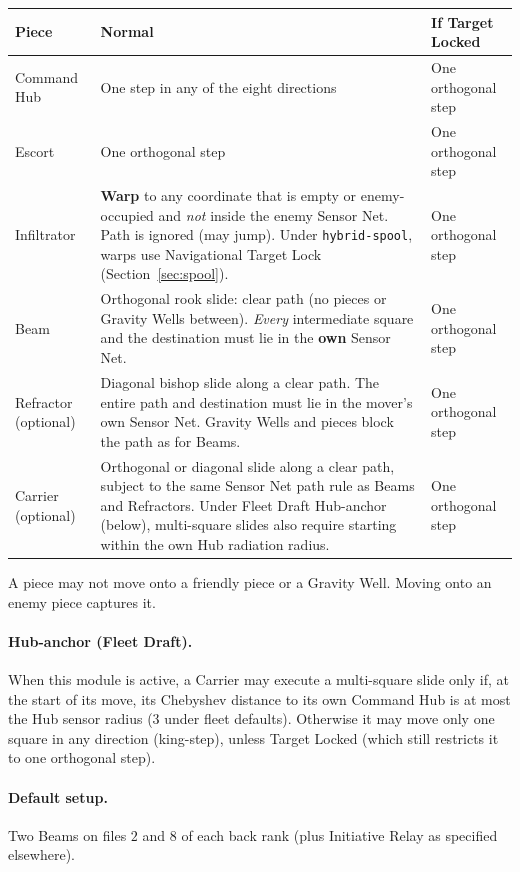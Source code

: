 \documentclass[11pt,a4paper]{article}
\begin{document}
\begin{center}
\begin{tabular}{@{}p{}p{}p{}@{}}
\toprule
\textbf{Piece} & \textbf{Normal} & \textbf{If Target Locked} \\
\midrule
Command Hub
  & One step in any of the eight directions
  & One orthogonal step \\
Escort
  & One orthogonal step
  & One orthogonal step \\
Infiltrator
  & \textbf{Warp} to any coordinate that is empty or enemy-occupied
    and \emph{not} inside the enemy Sensor Net.
    Path is ignored (may jump).
    Under \texttt{hybrid-spool}, warps use Navigational Target Lock
    (Section~\ref{sec:spool}).
  & One orthogonal step \\
Beam
  & Orthogonal rook slide: clear path (no pieces or Gravity Wells
    between). \emph{Every} intermediate square and the destination
    must lie in the \textbf{own} Sensor Net.
  & One orthogonal step \\
Refractor (optional)
  & Diagonal bishop slide along a clear path. The entire path and
    destination must lie in the mover's own Sensor Net. Gravity Wells
    and pieces block the path as for Beams.
  & One orthogonal step \\
Carrier (optional)
  & Orthogonal or diagonal slide along a clear path, subject to the
    same Sensor Net path rule as Beams and Refractors. Under Fleet Draft
    Hub-anchor (below), multi-square slides also require starting within
    the own Hub radiation radius.
  & One orthogonal step \\
\bottomrule
\end{tabular}
\end{center}

A piece may not move onto a friendly piece or a Gravity Well.
Moving onto an enemy piece captures it.

\paragraph{Hub-anchor (Fleet Draft).}
When this module is active, a Carrier may execute a multi-square slide
only if, at the start of its move, its Chebyshev distance to its own
Command Hub is at most the Hub sensor radius ($3$ under fleet defaults).
Otherwise it may move only one square in any direction (king-step),
unless Target Locked (which still restricts it to one orthogonal step).

\paragraph{Default setup.}
Two Beams on files $2$ and $8$ of each back rank (plus Initiative Relay
as specified elsewhere).
\end{document}
